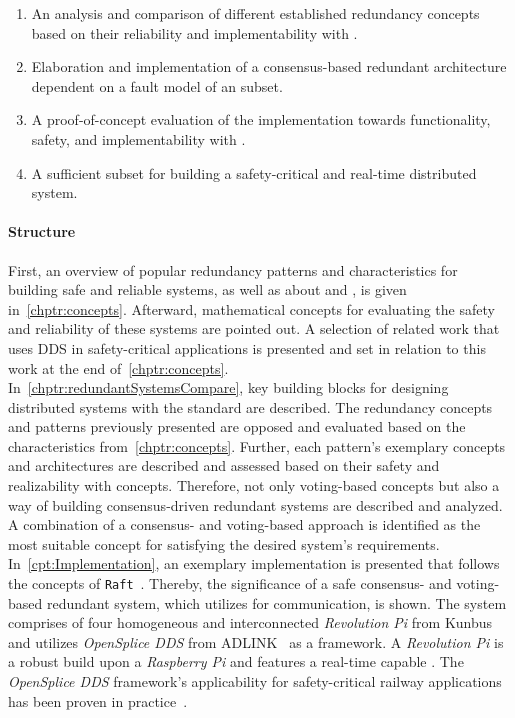 \begin{enumerate}
\item An analysis and comparison of different established redundancy concepts based on their reliability and implementability with .
\item Elaboration and implementation of a consensus-based redundant architecture dependent on a fault model of an  subset.
\item A proof-of-concept evaluation of the implementation towards functionality, safety, and implementability with .
\item A sufficient  subset for building a safety-critical and real-time distributed system.
\end{enumerate}

\paragraph{Structure}
First, an overview of popular redundancy patterns and characteristics for building safe and reliable systems, as well as about  and , is given in~\autoref{chptr:concepts}.
Afterward, mathematical concepts for evaluating the safety and reliability of these systems are pointed out.
A selection of related work that uses \gls{DDS} in safety-critical applications is presented and set in relation to this work at the end of~\autoref{chptr:concepts}.
\\

In~\autoref{chptr:redundantSystemsCompare}, key building blocks for designing distributed systems with the  standard are described.
The redundancy concepts and patterns previously presented are opposed and evaluated based on the characteristics from~\autoref{chptr:concepts}.
Further, each pattern's exemplary concepts and architectures are described and assessed based on their safety and realizability with  concepts.
Therefore, not only voting-based concepts but also a way of building consensus-driven redundant systems are described and analyzed.
A combination of a consensus- and voting-based approach is identified as the most suitable concept for satisfying the desired system's requirements.
\\

In~\autoref{cpt:Implementation}, an exemplary implementation is presented that follows the concepts of \texttt{Raft}~\cite{RaftConsensusPaper}.
Thereby, the significance of a safe consensus- and voting-based redundant system, which utilizes  for communication, is shown.
The system comprises of four homogeneous and interconnected \textit{Revolution Pi} from Kunbus~\cite{Kunbus} and utilizes \textit{OpenSplice DDS} from ADLINK~\cite{VortexOpenSplice} as a  framework.
A \textit{Revolution Pi} is a robust  build upon a \textit{Raspberry Pi} and features a real-time capable .
The \textit{OpenSplice DDS} framework's applicability for safety-critical railway applications has been proven in practice~\cite{SchmidtMissionCriticalChallenges}.
\\

